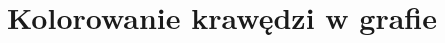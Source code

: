\documentclass[a4paper,10pt]{article}
\title{Kolorowanie krawędzi w grafie}
\author{}
\begin{document}
\maketitle

\begin{abstract}

\end{abstract}

\section{}
\end{document}
